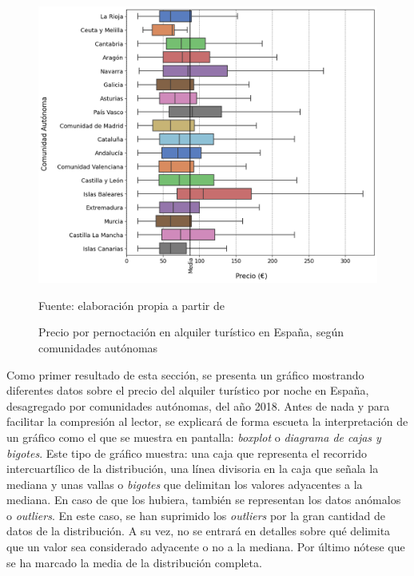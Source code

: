 \documentclass[a4paper,10pt]{article}
\begin{document}
            \begin{figure}[ht]
                \begin{flushleft}
                    \includegraphics*[width = 15cm]{graphics/spain_2018_price.png}
                    \begin{flushright}
                        \footnotesize{Fuente: elaboración propia a partir de \cite[(1)]{datahippo} }
                    \end{flushright}
                    \caption{Precio por pernoctación en alquiler turístico en España, según comunidades autónomas}
                \end{flushleft}
            \end{figure}

            Como primer resultado de esta sección, se presenta un gráfico mostrando diferentes datos sobre el precio del alquiler turístico por noche en España, desagregado por comunidades autónomas, del año 2018. Antes de nada y para facilitar la compresión al lector, se explicará de forma escueta la interpretación de un gráfico como el que se muestra en pantalla: \textit{boxplot} o \textit{diagrama de cajas y bigotes}. Este tipo de gráfico muestra:
            una caja que representa el recorrido intercuartílico de la distribución, una línea divisoria en la caja que señala la mediana y unas vallas o \textit{bigotes} que delimitan los valores adyacentes a la mediana. En caso de que los hubiera, también se representan los datos anómalos o \textit{outliers}. En este caso, se han suprimido los \textit{outliers} por la gran cantidad de datos de la distribución. A su vez, no se entrará en detalles sobre qué delimita que un valor sea considerado adyacente o no a la mediana. Por último nótese que se ha marcado la media de la distribución completa.\\
\end{document}
